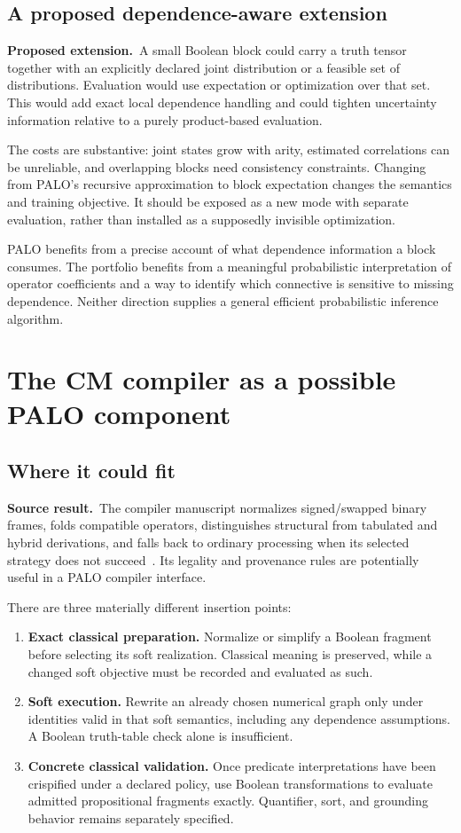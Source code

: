 \documentclass[11pt,a4paper]{article}
\theoremstyle{remark}
\newcommand{\sourceclaim}{\textbf{Source result.}\ }
\newcommand{\proposal}{\textbf{Proposed extension.}\ }
\begin{document}
\subsection{A proposed dependence-aware extension}
\proposal A small Boolean block could carry a truth tensor together with an explicitly declared joint distribution or a feasible set of distributions. Evaluation would use expectation or optimization over that set. This would add exact local dependence handling and could tighten uncertainty information relative to a purely product-based evaluation.

The costs are substantive: joint states grow with arity, estimated correlations can be unreliable, and overlapping blocks need consistency constraints. Changing from PALO's recursive approximation to block expectation changes the semantics and training objective. It should be exposed as a new mode with separate evaluation, rather than installed as a supposedly invisible optimization.

PALO benefits from a precise account of what dependence information a block consumes. The portfolio benefits from a meaningful probabilistic interpretation of operator coefficients and a way to identify which connective is sensitive to missing dependence. Neither direction supplies a general efficient probabilistic inference algorithm.

\section{The CM compiler as a possible PALO component}
\subsection{Where it could fit}
\sourceclaim The compiler manuscript normalizes signed/swapped binary frames, folds compatible operators, distinguishes structural from tabulated and hybrid derivations, and falls back to ordinary processing when its selected strategy does not succeed~\cite[Sections 3--5]{compiler}. Its legality and provenance rules are potentially useful in a PALO compiler interface.

There are three materially different insertion points:
\begin{enumerate}
\item \textbf{Exact classical preparation.} Normalize or simplify a Boolean fragment before selecting its soft realization. Classical meaning is preserved, while a changed soft objective must be recorded and evaluated as such.
\item \textbf{Soft execution.} Rewrite an already chosen numerical graph only under identities valid in that soft semantics, including any dependence assumptions. A Boolean truth-table check alone is insufficient.
\item \textbf{Concrete classical validation.} Once predicate interpretations have been crispified under a declared policy, use Boolean transformations to evaluate admitted propositional fragments exactly. Quantifier, sort, and grounding behavior remains separately specified.
\end{enumerate}
\end{document}
